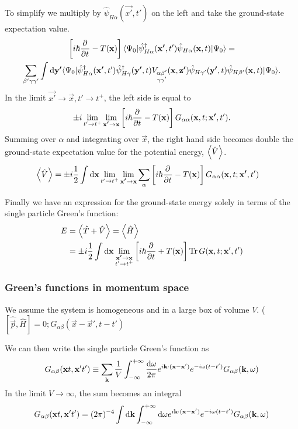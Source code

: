 To simplify we multiply by $\hat{\psi}_{H\alpha}(\vec{x'},t')$ on the left and take the ground-state expectation value.
\begin{multline*}
\left[ i\hbar \pd{}{t} - T(\vec{x})\right] \braket[\hat{\psi}_{H\alpha}^\dagger(\vec{x'},t')\hat{\psi}_{H\alpha}(\vec{x},t)]{\Psi_0}{\Psi_0} = \\ \sum_{\beta'\gamma\gamma'} \int \diff{\vec{y'}} \braket[\hat{\psi}_{H\alpha}^\dagger(\vec{x'},t')\hat{\psi}^\dagger_{H\gamma}(\vec{y'},t)V_{\substack{\alpha\beta' \\ \gamma \gamma'}}(\vec{x}, \vec{z'})\hat{\psi}_{H\gamma'}(\vec{y'},t)\hat{\psi}_{H\beta'}(\vec{x},t)]{\Psi_0}{\Psi_0}.
\end{multline*}
In the limit $\vec{x'}\to \vec{x}, t'\to t^+$, the left side is equal to
\[\pm i\lim_{t'\to t^+}\lim_{\bm{\mathrm{x'}}\to \bm{\mathrm{x}}}\left[i\hbar  \frac{\partial{^{}}}{\partial{{t}^{}}}  - T(\bm{\mathrm{x}})\right]G_{\alpha\alpha}(\bm{\mathrm{x}},t;\bm{\mathrm{x'}},t').\]
Summing over $\alpha$ and integrating over $\vec{x}$, the right hand side becomes double the ground-state expectation value for the potential energy, $\left\langle \hat{V} \right\rangle$.
\begin{align*}
\left\langle \hat{V} \right\rangle &= \pm i\frac{1}{2}\int \operatorname{d \!}{\bm{\mathrm{x}}}\lim_{t'\to t^+}\lim_{\bm{\mathrm{x'}}\to \bm{\mathrm{x}}}\sum_\alpha\left[i\hbar  \frac{\partial{^{}}}{\partial{{t}^{}}}  - T(\bm{\mathrm{x}})\right]G_{\alpha\alpha}(\bm{\mathrm{x}},t;\bm{\mathrm{x'}},t')
\end{align*}

Finally we have an expression for the ground-state energy solely in terms of the single particle Green's function:
\begin{align*}
E &= \left\langle \hat{T}+ \hat{V} \right\rangle = \left\langle \hat{H} \right\rangle \\
&= \pm i \frac{1}{2} \int \operatorname{d \!}{\bm{\mathrm{x}}}\lim_{\substack{\bm{\mathrm{x'}} \to \bm{\mathrm{x}} \\ t'\to t^+}} \left[i\hbar  \frac{\partial{^{}}}{\partial{{t}^{}}}  + T(\bm{\mathrm{x}})\right]\operatorname{Tr} G(\bm{\mathrm{x}},t; \bm{\mathrm{x}}',t')
\end{align*}

\subsubsection{Green's functions in momentum space}
We assume the system is homogeneous and in a large box of volume $V$. ($\left[\hat{\vec{p}},\hat{H}\right]=0; G_{\alpha\beta}(\vec{x}- \vec{x}', t - t')$

We can then write the single particle Green's function as
\begin{align*} G_{\alpha\beta}(\bm{\mathrm{x}}t, \bm{\mathrm{x}}'t') \equiv \sum_{\bm{\mathrm{k}}} \frac{1}{V}\int^{+\infty}_{-\infty} \frac{\operatorname{d \!}{\omega}}{2\pi} e^{i \bm{\mathrm{k}}\cdot (\bm{\mathrm{x}} - \bm{\mathrm{x}}')}e^{-i\omega(t-t')}G_{\alpha\beta}(\bm{\mathrm{k}}, \omega)
\end{align*}
In the limit $V\to \infty$, the sum becomes an integral
\[ G_{\alpha\beta}(\bm{\mathrm{x}}t, \bm{\mathrm{x}}'t') = (2\pi)^{-4}\int\operatorname{d \!}{\bm{\mathrm{k}}} \int^{+\infty}_{-\infty} \operatorname{d \!}{\omega} e^{i \bm{\mathrm{k}}\cdot (\bm{\mathrm{x}} - \bm{\mathrm{x}}')}e^{-i\omega(t-t')}G_{\alpha\beta}(\bm{\mathrm{k}}, \omega) \]

